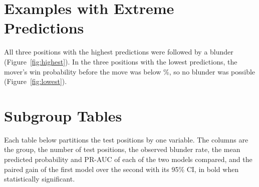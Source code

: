 \documentclass[11pt]{article}
\begin{document}
\section{Examples with Extreme Predictions}

All three positions with the highest predictions were followed by a blunder
(Figure~\ref{fig:highest}). In the three positions with the lowest
predictions, the mover's win probability before the move was below
\%, so no blunder was possible
(Figure~\ref{fig:lowest}).



\section{Subgroup Tables}

Each table below partitions the test positions by one variable. The columns
are the group, the number of test positions, the observed blunder rate, the
mean predicted probability and PR-AUC of each of the two models compared, and
the paired gain of the first model over the second with its 95\% CI, in bold
when statistically significant.

\fi
\end{document}
